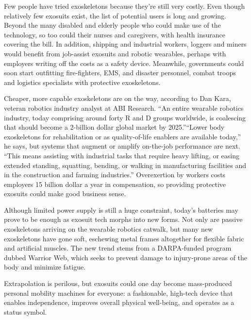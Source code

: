 \documentclass[12pt]{article}
\begin{document}
\indent

Few people have tried exoskeletons because they're still very costly. Even though relatively few exosuits exist, the list of potential users is long and growing. Beyond the many disabled and elderly people who could make use of the technology, so too could their nurses and caregivers, with health insurance covering the bill. In addition, shipping and industrial workers, loggers and miners would benefit from job-assist exosuits and robotic wearables, perhaps with employers writing off the costs as a safety device. Meanwhile, governments could soon start outfitting fire-fighters, EMS, and disaster personnel, combat troops and logistics specialists with protective exoskeletons.

\indent

Cheaper, more capable exoskeletons are on the way, according to Dan Kara, veteran robotics industry analyst at ABI Research. “An entire wearable robotics industry, today comprising around forty R and D groups worldwide, is coalescing that should become a 2-billion dollar global market by 2025.”“Lower body exoskeletons for rehabilitation or as quality-of-life enablers are available today,” he says, but systems that augment or amplify on-the-job performance are next. “This means assisting with industrial tasks that require heavy lifting, or easing extended standing, squatting, bending, or walking in manufacturing facilities and in the construction and farming industries.” Overexertion by workers costs employers 15 billion dollar a year in compensation, so providing protective exosuits could make good business sense.


\indent

Although limited power supply is still a huge constraint, today's batteries may prove to be enough as exosuit tech morphs into new forms. Not only are passive exoskeletons arriving on the wearable robotics catwalk, but many new exoskeletons have gone soft, eschewing metal frames altogether for flexible fabric and artificial muscles. The new trend stems from a DARPA-funded program dubbed Warrior Web, which seeks to prevent damage to injury-prone areas of the body and minimize fatigue.

\indent

Extrapolation is perilous, but exosuits could one day become mass-produced personal mobility machines for everyone: a fashionable, high-tech device that enables independence, improves overall physical well-being, and operates as a status symbol.
\end{document}
